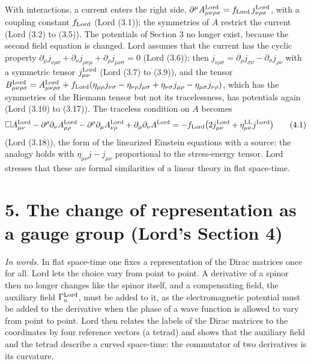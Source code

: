 \documentclass[
  10pt,
]{article}
\begin{document}
With interactions, a current enters the right side,
\(\partial^\mu A^{\rm Lord}_{\mu\nu\rho\sigma}=f_{\rm Lord}\,j^{\rm Lord}_{\nu\rho\sigma}\),
with a coupling constant \(f_{\rm Lord}\) (Lord (3.1)); the symmetries
of \(A\) restrict the current (Lord (3.2) to (3.5)). The potentials of
Section 3 no longer exist, because the second field equation is changed.
Lord assumes that the current has the cyclic property
\(\partial_\mu j_{\nu\rho\sigma}+\partial_\nu j_{\rho\sigma\mu}+\partial_\rho j_{\mu\nu\sigma}=0\)
(Lord (3.6)); then
\(j_{\nu\rho\sigma}=\partial_\rho j_{\sigma\nu}-\partial_\sigma j_{\rho\nu}\)
with a symmetric tensor \(j^{\rm Lord}_{\mu\nu}\) (Lord (3.7) to (3.9)),
and the tensor
\(B^{\rm Lord}_{\mu\nu\rho\sigma}=A^{\rm Lord}_{\mu\nu\rho\sigma}+f_{\rm Lord}(\eta_{\mu\rho}j_{\nu\sigma}-\eta_{\nu\rho}j_{\mu\sigma}+\eta_{\nu\sigma}j_{\mu\rho}-\eta_{\mu\sigma}j_{\nu\rho})\),
which has the symmetries of the Riemann tensor but not its
tracelessness, has potentials again (Lord (3.10) to (3.17)). The
traceless condition on \(A\) becomes
\[\Box A^{\rm Lord}_{\mu\nu}-\partial^\rho\partial_\nu A^{\rm Lord}_{\mu\rho}-\partial^\rho\partial_\mu A^{\rm Lord}_{\nu\rho}+\partial_\mu\partial_\nu A^{\rm Lord}=-f_{\rm Lord}\big(2j^{\rm Lord}_{\mu\nu}+\eta^{\rm LL}_{\mu\nu}j^{\rm Lord}\big)\tag{4.1}\]
(Lord (3.18)), the form of the linearized Einstein equations with a
source: the analogy holds with \(\eta_{\mu\nu}j-j_{\mu\nu}\)
proportional to the stress-energy tensor. Lord stresses that these are
formal similarities of a linear theory in flat space-time.

\hypertarget{the-change-of-representation-as-a-gauge-group-lords-section-4}{%
\section{5. The change of representation as a gauge group (Lord's
Section
4)}\label{the-change-of-representation-as-a-gauge-group-lords-section-4}}

\emph{In words.} In flat space-time one fixes a representation of the
Dirac matrices once for all. Lord lets the choice vary from point to
point. A derivative of a spinor then no longer changes like the spinor
itself, and a compensating field, the auxiliary field
\(\Gamma^{\rm Lord}_a\), must be added to it, as the electromagnetic
potential must be added to the derivative when the phase of a wave
function is allowed to vary from point to point. Lord then relates the
labels of the Dirac matrices to the coordinates by four reference
vectors (a tetrad) and shows that the auxiliary field and the tetrad
describe a curved space-time: the commutator of two derivatives is its
curvature.
\end{document}
